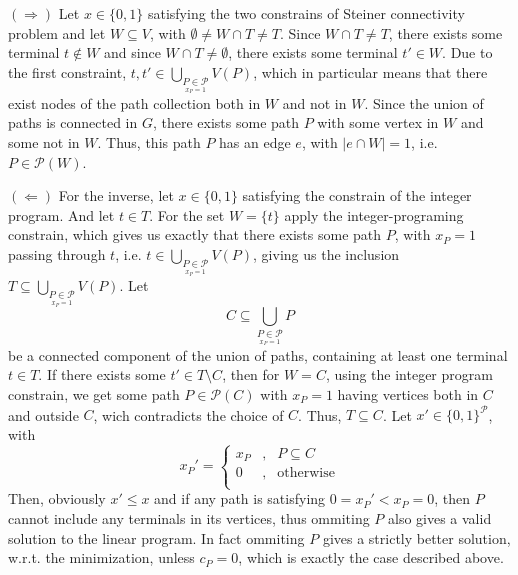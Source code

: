 \documentclass[12pt]{article}
\begin{document}
$(\Rightarrow)$ Let $x\in\{0,1\}$ satisfying the two constrains of Steiner connectivity problem and let $W\subseteq V$, with $\emptyset\neq W\cap T\neq T$. Since $W\cap T\neq T$, there exists some terminal $t\not\in W$ and since $W\cap T\neq\emptyset$, there exists some terminal $t'\in W$. Due to the first constraint, $t,t'\in\bigcup_{\underset{x_P=1}{P\in\mathcal{P}}}V(P)$, which in particular means that there exist nodes of the path collection both in $W$ and not in $W$. Since the union of paths is connected in $G$, there exists some path $P$ with some vertex in $W$ and some not in $W$. Thus, this path $P$ has an edge $e$, with $|e\cap W|=1$, i.e. $P\in\mathcal{P}(W)$.

$(\Leftarrow)$ For the inverse, let $x\in\{0,1\}$ satisfying the constrain of the integer program. And let $t\in T$. For the set $W=\{t\}$ apply the integer-programing constrain, which gives us exactly that there exists some path $P$, with $x_P=1$ passing through $t$, i.e. $t\in\bigcup_{\underset{x_P=1}{P\in\mathcal{P}}}V(P)$, giving us the inclusion $T\subseteq\bigcup_{\underset{x_P=1}{P\in\mathcal{P}}}V(P)$. Let
$$C\subseteq\bigcup_{\underset{x_P=1}{P\in\mathcal{P}}}P$$
be a connected component of the union of paths, containing at least one terminal $t\in T$. If there exists some $t'\in T\setminus C$, then for $W=C$, using the integer program constrain, we get some path $P\in\mathcal{P}(C)$ with $x_P=1$ having vertices both in $C$ and outside $C$, wich contradicts the choice of $C$. Thus, $T\subseteq C$. Let $x'\in\{0,1\}^{\mathcal{P}}$, with
$$x_P'=\left\{\begin{array}{lcl}x_P&,&P\subseteq C\\0&,&\text{otherwise}\\\end{array}\right.$$
Then, obviously $x'\leq  x$ and if any path is satisfying $0=x_P'<x_P=0$, then $P$ cannot include any terminals in its vertices, thus ommiting $P$ also gives a valid solution to the linear program. In fact ommiting $P$ gives a strictly better solution, w.r.t. the minimization, unless $c_P=0$, which is exactly the case described above.
\end{document}
